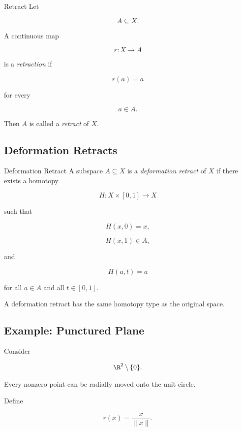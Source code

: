 \begin{definitionbox}{Retract}
Let

\[
A\subseteq X.
\]

A continuous map

\[
r:X\to A
\]

is a \emph{retraction} if

\[
\boxed{
r(a)=a
}
\]

for every

\[
a\in A.
\]
\end{definitionbox}

Then \(A\) is called a \emph{retract} of \(X\).

\subsection{Deformation Retracts}
\label{subsec:deformation-retracts}

\begin{definitionbox}{Deformation Retract}
A subspace \(A\subseteq X\) is a \emph{deformation retract} of \(X\) if
there exists a homotopy

\[
H:X\times[0,1]\to X
\]

such that

\[
H(x,0)=x,
\]

\[
H(x,1)\in A,
\]

and

\[
\boxed{
H(a,t)=a
}
\]

for all \(a\in A\) and all \(t\in[0,1]\).
\end{definitionbox}

A deformation retract has the same homotopy type as the original space.

\subsection{Example: Punctured Plane}
\label{subsec:punctured-plane-deformation-retract}

Consider

\[
\R^2\setminus\{0\}.
\]

Every nonzero point can be radially moved onto the unit circle.

Define

\[
r(x)=\frac{x}{\|x\|}.
\]

